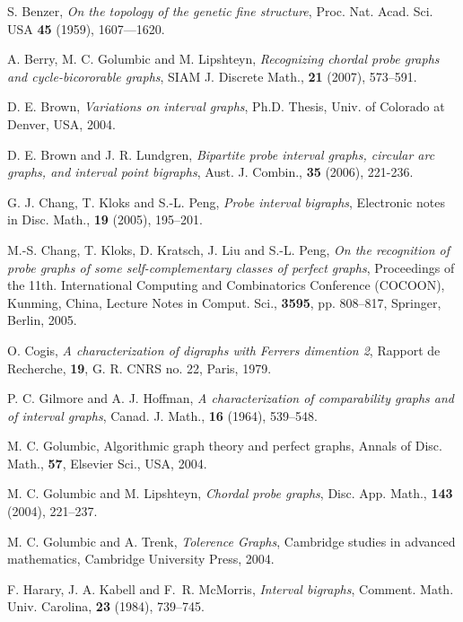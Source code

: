 \documentclass[secthm]{elsart}
\begin{document}
\begin{thebibliography}{10}\label{bibliography}

S. Benzer, \emph{On the topology of the genetic fine structure}, Proc. Nat. Acad. Sci. USA \textbf{45} (1959), 1607---1620.

A. Berry, M. C. Golumbic and M. Lipshteyn, \emph{Recognizing chordal probe graphs and cycle-bicororable graphs}, SIAM J. Discrete Math., \textbf{21} (2007), 573--591.

D. E. Brown, \emph{Variations on interval graphs}, Ph.D. Thesis, Univ. of Colorado at Denver, USA, 2004.

D. E. Brown and J. R. Lundgren, \emph{Bipartite probe interval graphs, circular arc graphs, and interval point bigraphs}, Aust. J. Combin., \textbf{35} (2006), 221-236.

G. J. Chang, T. Kloks and S.-L. Peng, \emph{Probe interval bigraphs}, Electronic notes in Disc. Math., \textbf{19} (2005), 195--201.

M.-S. Chang, T. Kloks, D. Kratsch, J. Liu and S.-L. Peng, \emph{On the recognition of probe graphs of some self-complementary classes of perfect graphs}, Proceedings of the 11th. International Computing and Combinatorics Conference (COCOON), Kunming, China, Lecture Notes in Comput. Sci., \textbf{3595}, pp. 808--817, Springer, Berlin, 2005.

O. Cogis, \emph{A characterization of digraphs with Ferrers dimention 2}, Rapport de Recherche, \textbf{19}, G. R. CNRS no. 22, Paris, 1979.

P. C. Gilmore and A. J. Hoffman, \emph{A characterization of comparability graphs and of interval graphs}, Canad. J. Math., \textbf{16} (1964), 539--548.

M. C. Golumbic, Algorithmic graph theory and perfect graphs, Annals of Disc. Math., \textbf{57}, Elsevier Sci., USA, 2004.

M. C. Golumbic and M. Lipshteyn, \emph{Chordal probe graphs}, Disc. App. Math., \textbf{143} (2004), 221--237.

M. C. Golumbic and A. Trenk, \emph{Tolerence Graphs}, Cambridge studies in advanced mathematics, Cambridge University Press, 2004.

F. Harary, J. A. Kabell and F.~R. McMorris, \emph{Interval bigraphs}, Comment. Math. Univ. Carolina, \textbf{23} (1984), 739--745.


\end{thebibliography}
\end{document}
